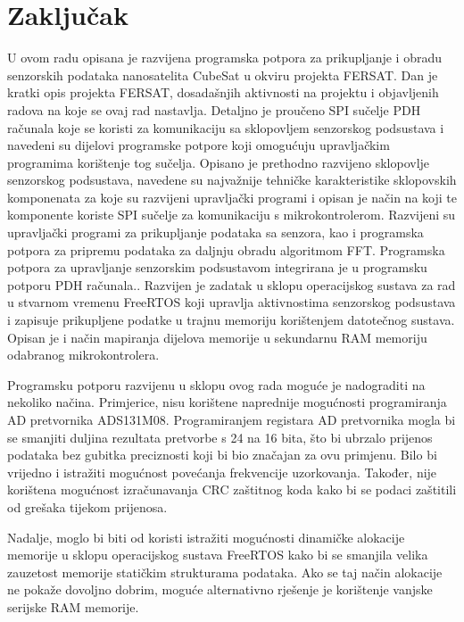 \chapter{Zaključak}

U ovom radu opisana je razvijena programska potpora za prikupljanje i obradu senzorskih podataka nanosatelita CubeSat u okviru projekta FERSAT. Dan je kratki opis projekta FERSAT, dosadašnjih aktivnosti na projektu i objavljenih radova na koje se ovaj rad nastavlja. Detaljno je proučeno SPI sučelje PDH računala koje se koristi za komunikaciju sa sklopovljem senzorskog podsustava i navedeni su dijelovi programske potpore koji omogućuju upravljačkim programima korištenje tog sučelja. Opisano je prethodno razvijeno sklopovlje senzorskog podsustava, navedene su najvažnije tehničke karakteristike sklopovskih komponenata za koje su razvijeni upravljački programi i opisan je način na koji te komponente koriste SPI sučelje za komunikaciju s mikrokontrolerom. Razvijeni su upravljački programi za prikupljanje podataka sa senzora, kao i programska potpora za pripremu podataka za daljnju obradu algoritmom FFT. Programska potpora za upravljanje senzorskim podsustavom integrirana je u programsku potporu PDH računala.. Razvijen je zadatak u sklopu operacijskog sustava za rad u stvarnom vremenu FreeRTOS koji upravlja aktivnostima senzorskog podsustava i zapisuje prikupljene podatke u trajnu memoriju korištenjem datotečnog sustava. Opisan je i način mapiranja dijelova memorije u sekundarnu RAM memoriju odabranog mikrokontrolera.

Programsku potporu razvijenu u sklopu ovog rada moguće je nadograditi na nekoliko načina. Primjerice, nisu korištene naprednije mogućnosti programiranja AD pretvornika ADS131M08. Programiranjem registara AD pretvornika mogla bi se smanjiti duljina rezultata pretvorbe s 24 na 16 bita, što bi ubrzalo prijenos podataka bez gubitka preciznosti koji bi bio značajan za ovu primjenu. Bilo bi vrijedno i istražiti mogućnost povećanja frekvencije uzorkovanja. Također, nije korištena mogućnost izračunavanja CRC zaštitnog koda kako bi se podaci zaštitili od grešaka tijekom prijenosa.

Nadalje, moglo bi biti od koristi istražiti mogućnosti dinamičke alokacije memorije u sklopu operacijskog sustava FreeRTOS kako bi se smanjila velika zauzetost memorije statičkim strukturama podataka. Ako se taj način alokacije ne pokaže dovoljno dobrim, moguće alternativno rješenje je korištenje vanjske serijske RAM memorije.